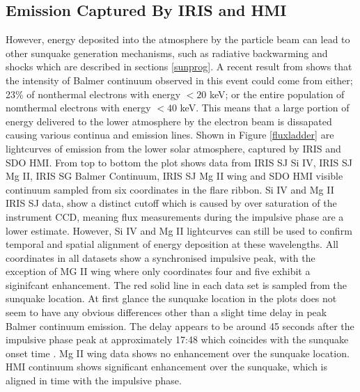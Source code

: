 \documentclass[11pt]{article}
\begin{document}
\subsection{Emission Captured By IRIS and HMI}
However, energy deposited into the atmosphere by the particle beam can lead to other sunquake generation mechanisms, such as radiative backwarming and shocks which are described in sections \ref{sunprog}. A recent result from \cite{2016ApJ...816...88K} shows that the intensity of Balmer continuum observed in this event could come from either; 23\% of nonthermal electrons with energy $<20$ keV; or the entire population of nomthermal electrons with energy $<40$ keV. This means that a large portion of energy delivered to the lower atmosphere by the electron beam is dissapated causing various continua and emission lines. Shown in Figure \ref{fluxladder} are lightcurves of emission from the lower solar atmosphere, captured by IRIS and SDO HMI. From top to bottom the plot shows data from IRIS SJ Si IV, IRIS SJ Mg II, IRIS SG Balmer Continuum, IRIS SJ Mg II wing and SDO HMI visible continuum sampled from six coordinates in the flare ribbon. Si IV and Mg II IRIS SJ data, show a distinct cutoff which is caused by over saturation of the instrument CCD, meaning flux measurements during the impulsive phase are a lower estimate. However, Si IV and Mg II lightcurves can still be used to confirm temporal and spatial alignment of energy deposition at these wavelengths. All coordinates in all datasets show a synchronised impulsive peak, with the exception of MG II wing where only coordinates four and five exhibit a siginifcant enhancement. The red solid line in each data set is sampled from the sunquake location. At first glance the sunquake location in the plots does not seem to have any obvious differences other than a slight time delay in peak Balmer continuum emission. The delay appears to be around 45 seconds after the impulsive phase peak at approximately 17:48 which coincides with the sunquake onset time \citep{2015ApJ...812...35M}. Mg II wing data shows no enhancement over the sunquake location. HMI continuum shows significant enhancement over the sunquake, which is aligned in time with the impulsive phase. 
\end{document}
